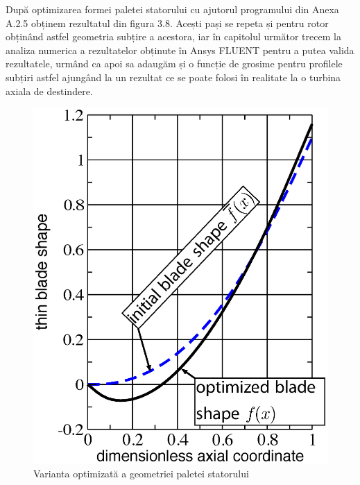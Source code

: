 După optimizarea formei paletei statorului cu ajutorul programului din Anexa A.2.5 obținem rezultatul din figura 3.8. Acești pași se repeta și pentru rotor obținând astfel geometria subțire a acestora, iar în capitolul următor trecem la analiza numerica a rezultatelor obținute în Ansys FLUENT pentru a putea valida rezultatele, urmând ca apoi sa adaugăm și o funcție de grosime pentru profilele subțiri astfel ajungând la un rezultat ce se poate folosi în realitate la o turbina axiala de destindere.

\begin{figure}[h]
	\centering
	\includegraphics[scale=0.4]{figures/stator_optimized_blade.eps}
	\caption{Varianta optimizată a geometriei paletei statorului}
	\label{Varianta optimizată a geometriei paletei statorului}
\end{figure}

\clearpage